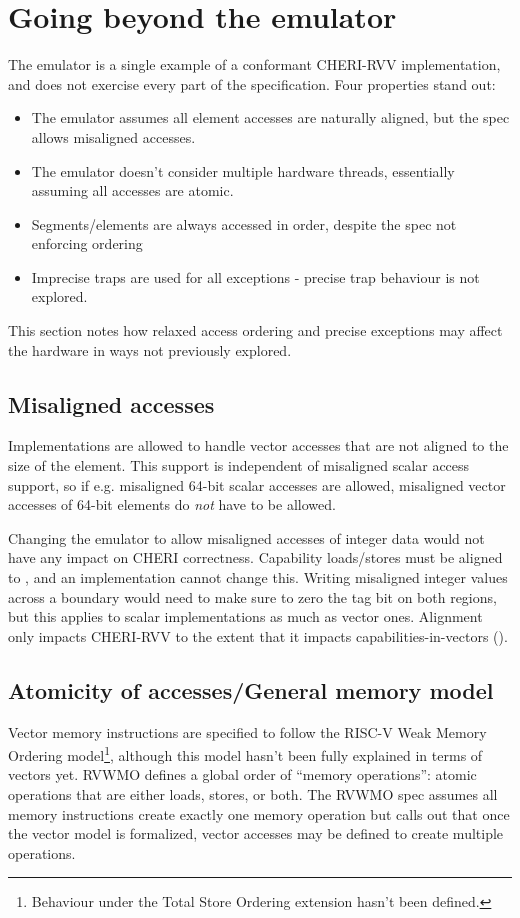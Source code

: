 \section{Going beyond the emulator}
The emulator is a single example of a conformant CHERI-RVV implementation, and does not exercise every part of the specification.
Four properties stand out:
\begin{itemize}
    \item The emulator assumes all element accesses are naturally aligned, but the spec allows misaligned accesses.
    \item The emulator doesn't consider multiple hardware threads, essentially assuming all accesses are atomic.
    \item Segments/elements are always accessed in order, despite the spec not enforcing ordering
    \item Imprecise traps are used for all exceptions - precise trap behaviour is not explored.
\end{itemize}
This section notes how relaxed access ordering and precise exceptions may affect the hardware in ways not previously explored.

\subsection{Misaligned accesses}
Implementations are allowed to handle vector accesses that are not aligned to the size of the element.
This support is independent of misaligned scalar access support, so if e.g. misaligned 64-bit scalar accesses are allowed, misaligned vector accesses of 64-bit elements do \emph{not} have to be allowed.

Changing the emulator to allow misaligned accesses of integer data would not have any impact on CHERI correctness.
Capability loads/stores must be aligned to \cite[Section 3.5.2]{TR-951}, and an implementation cannot change this.
Writing misaligned integer values across a  boundary would need to make sure to zero the tag bit on both regions, but this applies to scalar implementations as much as vector ones.
Alignment only impacts CHERI-RVV to the extent that it impacts capabilities-in-vectors ().

\subsection{Atomicity of accesses/General memory model}
Vector memory instructions are specified to follow the RISC-V Weak Memory Ordering model\cite{specification-RVV-v1.0}\footnote{Behaviour under the Total Store Ordering extension hasn't been defined.}, although this model hasn't been fully explained in terms of vectors yet.
RVWMO defines a global order of \enquote{memory operations}: atomic operations that are either loads, stores, or both\cite[Chapter 14]{specification-RISCV-vol1-20191213}.
The RVWMO spec assumes all memory instructions create exactly one memory operation but calls out that once the vector model is formalized, vector accesses may be defined to create multiple operations.

